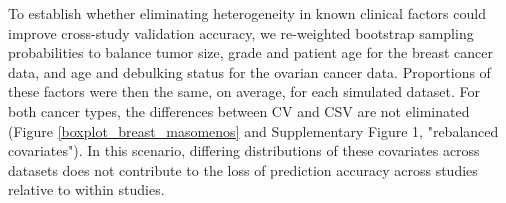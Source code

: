 \documentclass{bioinfo}
\begin{document}

  To establish whether eliminating heterogeneity in known clinical
  factors could improve cross-study validation accuracy, we
  re-weighted bootstrap sampling probabilities to balance tumor size,
  grade and patient age for the breast cancer data, and age and 
  debulking status for the ovarian cancer data. Proportions of these factors
  were then the same, on average, for each simulated dataset. 
  For both cancer types, the differences between CV and CSV are not eliminated 
  (Figure \ref{boxplot_breast_masomenos} and Supplementary Figure 1, "rebalanced covariates"). In this scenario, differing distributions of these
  covariates across datasets does not contribute to the loss of
  prediction accuracy across studies relative to within studies.
\end{document}
